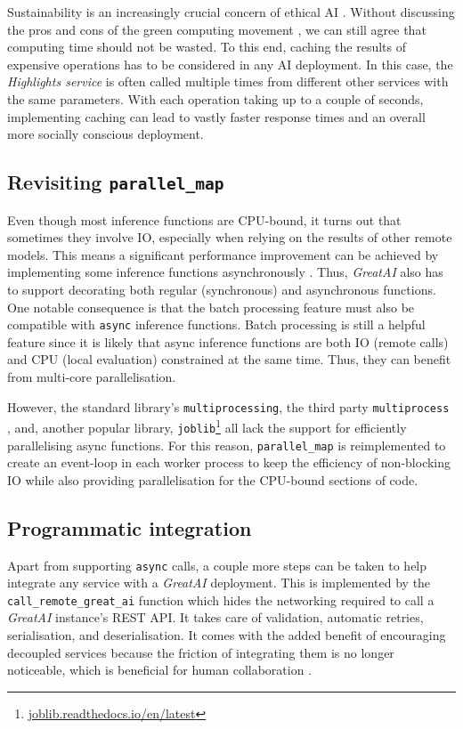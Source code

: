 Sustainability is an increasingly crucial concern of ethical AI \cite{van2021sustainable}. Without discussing the pros and cons of the green computing movement \cite{10.1145/1400181.1400186}, we can still agree that computing time should not be wasted. To this end, caching the results of expensive operations has to be considered in any AI deployment. In this case, the \textit{Highlights service} is often called multiple times from different other services with the same parameters. With each operation taking up to a couple of seconds, implementing caching can lead to vastly faster response times and an overall more socially conscious deployment.

\subsection{Revisiting \texttt{parallel\_map}}

Even though most inference functions are CPU-bound, it turns out that sometimes they involve IO, especially when relying on the results of other remote models. This means a significant performance improvement can be achieved by implementing some inference functions asynchronously \cite{tilkov2010node}. Thus, \textit{GreatAI} also has to support decorating both regular (synchronous) and asynchronous functions. One notable consequence is that the batch processing feature must also be compatible with \texttt{async} inference functions. Batch processing is still a helpful feature since it is likely that async inference functions are both IO (remote calls) and CPU (local evaluation) constrained at the same time. Thus, they can benefit from multi-core parallelisation. 

However, the standard library's \texttt{multiprocessing}, the third party \texttt{multiprocess} \cite{mckerns2012building}, and, another popular library, \texttt{joblib}\footnote{\href{https://joblib.readthedocs.io/en/latest/}{joblib.readthedocs.io/en/latest}} all lack the support for efficiently parallelising async functions. For this reason, \texttt{parallel\_map} is reimplemented to create an event-loop in each worker process to keep the efficiency of non-blocking IO while also providing parallelisation for the CPU-bound sections of code.

\subsection{Programmatic integration}

Apart from supporting \texttt{async} calls, a couple more steps can be taken to help integrate any service with a \textit{GreatAI} deployment. This is implemented by the \texttt{call\_remote\_great\_ai} function which hides the networking required to call a \textit{GreatAI} instance's REST API. It takes care of validation, automatic retries, serialisation, and deserialisation. It comes with the added benefit of encouraging decoupled services because the friction of integrating them is no longer noticeable, which is beneficial for human collaboration \cite{hasselbring2002component}.

